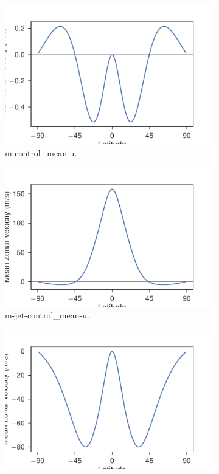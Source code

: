 \begin{figure}
  \begin{subfigure}[b]{0.33\textwidth}
    \includegraphics[width=1.0\textwidth]{figures/nonlinear-circulation/m-control_mean-u.pdf}
    \caption{m-control_mean-u.}
    \label{fig:m-control_mean-u}
  \end{subfigure}
  \begin{subfigure}[b]{0.33\textwidth}
    \includegraphics[width=1.0\textwidth]{figures/nonlinear-circulation/m-jet-control_mean-u.pdf}
    \caption{m-jet-control_mean-u.}
    \label{fig:m-jet-control_mean-u}
  \end{subfigure}
  \begin{subfigure}[b]{0.33\textwidth}
    \includegraphics[width=1.0\textwidth]{figures/nonlinear-circulation/m-jet-control_mean-u-minus-U.pdf}

\end{subfigure}
\end{figure}
